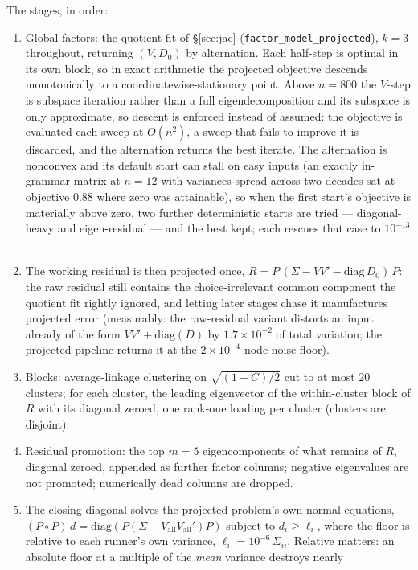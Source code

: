 \documentclass[11pt]{article}
\begin{document}
The stages, in order:
\begin{enumerate}
\item Global factors: the quotient fit of \S\ref{sec:jac}
(\texttt{factor\_model\_projected}), $k=3$ throughout, returning $(V,D_0)$
by alternation. Each half-step is optimal in its own block, so in exact
arithmetic the projected objective descends monotonically to a
coordinatewise-stationary point. Above $n=800$ the $V$-step is subspace
iteration rather than a full eigendecomposition and its subspace is only
approximate, so descent is enforced instead of assumed: the objective is
evaluated each sweep at $O(n^2)$, a sweep that fails to improve it is
discarded, and the alternation returns the best iterate. The alternation
is nonconvex and its default start can stall on easy inputs (an exactly
in-grammar matrix at $n=12$ with variances spread across two decades sat
at objective $0.88$ where zero was attainable), so when the first
start's objective is materially above zero, two further deterministic
starts are tried --- diagonal-heavy and eigen-residual --- and the best
kept; each rescues that case to $10^{-13}$.
\item The working residual is then
projected once, $R=P\,(\Sigma-VV'-\mathrm{diag}\,D_0)\,P$: the raw residual
still contains the choice-irrelevant common component the quotient fit
rightly ignored, and letting later stages chase it manufactures projected
error (measurably: the raw-residual variant distorts an input already of the
form $VV'+\mathrm{diag}(D)$ by $1.7\times10^{-2}$ of total variation;
the projected pipeline returns it at the $2\times10^{-4}$ node-noise
floor).
\item Blocks: average-linkage clustering on
$\sqrt{(1-C)/2}$ cut to at most $20$ clusters; for each cluster, the leading
eigenvector of the within-cluster block of $R$ with its diagonal zeroed,
one rank-one loading per cluster (clusters are disjoint).
\item Residual promotion: the top $m=5$ eigencomponents of what remains of $R$, diagonal
zeroed, appended as further factor columns; negative eigenvalues are not
promoted; numerically dead columns are dropped.
\item The closing diagonal
solves the projected problem's own normal equations,
$(P\!\circ\!P)\,d=\mathrm{diag}(P(\Sigma-V_{\mathrm{all}}V_{\mathrm{all}}')P)$
subject to $d_i\ge\ell_i$, where the floor is relative to each runner's
own variance, $\ell_i=10^{-6}\,\Sigma_{ii}$. Relative matters: an
absolute floor at a multiple of the \emph{mean} variance destroys nearly

\end{enumerate}
\end{document}
